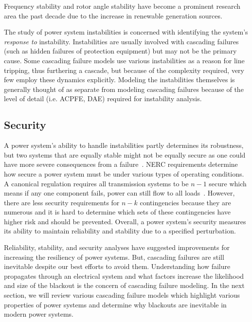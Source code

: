 Frequency stability and rotor angle stability have become a prominent research area the past decade due to the increase in renewable generation sources.  
	

The study of power system instabilities is concerned with identifying the system's \textit{response to} instability.  Instabilities are usually involved with cascading failures (such as hidden failures of protection equipment) but may not be the primary cause.  Some cascading failure models use various instabilities as a reason for line tripping, thus furthering a cascade, but because of the complexity required, very few employ these dynamics explicitly.  Modeling the instabilities themselves is generally thought of as separate from modeling cascading failures because of the level of detail (i.e. ACPFE, DAE) required for instability analysis.


\subsection{Security}
A power system's ability to handle instabilities partly determines its robustness, but two systems that are equally stable might not be equally secure as one could have more severe consequences from a failure~\cite{security_def}.  NERC requirements determine how secure a power system must be under various types of operating conditions. A canonical regulation requires all transmission systems to be $n-1$ secure which means if any one component fails, power can still flow to all loads~\cite{nerc_stand}.  However, there are less security requirements for $n-k$ contingencies because they are numerous and it is hard to determine which sets of these contingencies have higher risk and should be prevented.  Overall, a power system's security measures its ability to maintain reliability and stability due to a specified perturbation.


Reliability, stability, and security analyses have suggested improvements for increasing the resiliency of power systems.  But, cascading failures are still inevitable despite our best efforts to avoid them.  Understanding how failure propagates through an electrical system and what factors increase the likelihood and size of the blackout is the concern of cascading failure modeling.  In the next section, we will review various cascading failure models which highlight various properties of power systems and determine why blackouts are inevitable in modern power systems.






   



























